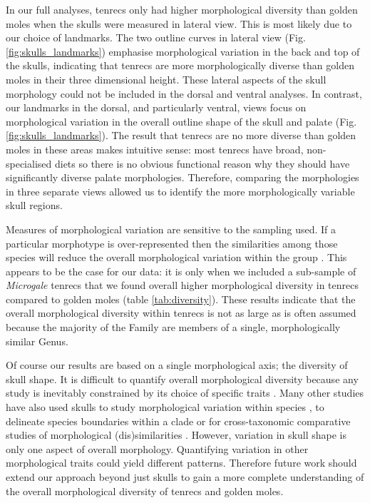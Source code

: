 \documentclass[12pt,a4paper]{article}
\begin{document}
	
	In our full analyses, tenrecs only had higher morphological diversity than golden moles when the skulls were measured in lateral view. This is most likely due to our choice of landmarks. The two outline curves in lateral view (Fig. \ref{fig:skulls_landmarks}) emphasise morphological variation in the back and top of the skulls, indicating that tenrecs are more morphologically diverse than golden moles in their three dimensional height. 
	These lateral aspects of the skull morphology could not be included in the dorsal and ventral analyses. In contrast, our landmarks in the dorsal, and particularly ventral, views focus on morphological variation in the overall outline shape of the skull and palate (Fig. \ref{fig:skulls_landmarks}). The result that tenrecs are no more diverse than golden moles in these areas makes intuitive sense: most tenrecs have broad, non-specialised diets \citep{Olson2013} so there is no obvious functional reason why they should have significantly diverse palate morphologies.
	Therefore, comparing the morphologies in three separate views allowed us to identify the more morphologically variable skull regions. 
	
	
	
	Measures of morphological variation are sensitive to the sampling used. If a particular morphotype is over-represented then the similarities among those species will reduce the overall morphological variation within the group \citep{Foote1991}. This appears to be the case for our data: it is only when we included a sub-sample of \textit{Microgale} tenrecs that we found overall higher morphological diversity in tenrecs compared to golden moles (table \ref{tab:diversity}). These results indicate that the overall morphological diversity within tenrecs is not as large as is often assumed \citep[e.g.][]{Eisenberg1969, Olson2013} because the majority of the Family are members of a single, morphologically similar Genus.


	Of course our results are based on a single morphological axis; the diversity of skull shape. It is difficult to quantify overall morphological diversity because any study is inevitably constrained by its choice of specific traits \citep{Roy1997}. Many other studies have also used skulls to study morphological variation within species \citep{Blagojevic2011, Bornholdt2008}, to delineate species boundaries within a clade \citep[e.g.][]{Panchetti2008} or for cross-taxonomic comparative studies of morphological (dis)similarities \citep[e.g.][]{Ruta2013, Goswami2011, Wroe2007}. 
	However, variation in skull shape is only one aspect of overall morphology. Quantifying variation in other morphological traits could yield different patterns. Therefore future work should extend our approach beyond just skulls to gain a more complete understanding of the overall morphological diversity of tenrecs and golden moles. 
		
\end{document}

